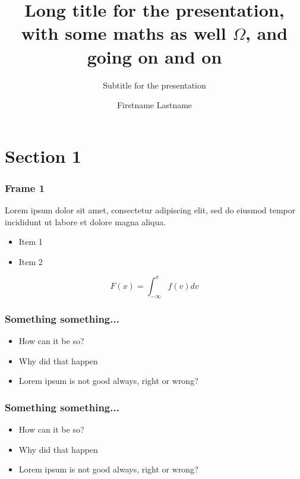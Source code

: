 \documentclass[aspectratio=169, 12pt]{beamer}
\title[Short title]{Long title for the presentation, with some maths as well $\Omega$, and going on and on}
\subtitle{Subtitle for the presentation}
\author{Firstname Lastname}
\date{}
\begin{document}
\begin{frame}
\titlepage
\end{frame}




\section{Section 1}


\begin{frame}
\frametitle{Frame 1}

Lorem ipsum dolor sit amet, consectetur adipiscing elit, sed do eiusmod tempor incididunt ut labore et dolore magna aliqua. 

\begin{itemize}
	\item Item 1
	\item Item 2
\end{itemize}

\[F(x) = \int_{-\infty}^x f(v)dv \]

\end{frame}

\begin{frame}
	\frametitle{Something something...}
	
	\begin{itemize}
		\item How can it be so?
		\item Why did that happen
		\item Lorem ipsum is not good always, right or wrong?
	\end{itemize}
	
\end{frame}


\begin{frame}
\frametitle{Something something...}

\begin{itemize}
	\item How can it be so?
	\item Why did that happen
	\item Lorem ipsum is not good always, right or wrong?
\end{itemize}

\end{frame}
\end{document}
